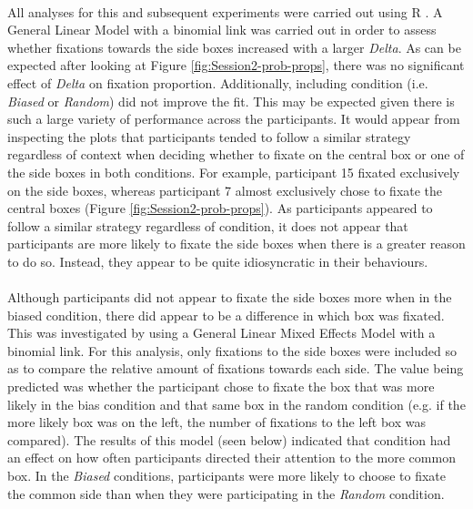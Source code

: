 \documentclass[12pt]{article}
\begin{document}
\paragraph{} All analyses for this and subsequent experiments were carried out using R \cite{R}. A General Linear Model with a binomial link was carried out in order to assess whether fixations towards the side boxes increased with a larger \textit{Delta}. As can be expected after looking at Figure \ref{fig:Session2-prob-props}, there was no significant effect of \textit{Delta} on fixation proportion. Additionally, including condition (i.e. \textit{Biased} or \textit{Random}) did not improve the fit. This may be expected given there is such a large variety of performance across the participants. It would appear from inspecting the plots that participants tended to follow a similar strategy regardless of context when deciding whether to fixate on the central box or one of the side boxes in both conditions. For example, participant 15  fixated exclusively on the side boxes, whereas participant 7 almost exclusively chose to fixate the central boxes (Figure \ref{fig:Session2-prob-props}). As participants appeared to follow a similar strategy regardless of condition, it does not appear that participants are more likely to fixate the side boxes when there is a greater reason to do so. Instead, they appear to be quite idiosyncratic in their behaviours. 

\paragraph{} Although participants did not appear to fixate the side boxes more when in the biased condition, there did appear to be a difference in which box was fixated. This was investigated by using a General Linear Mixed Effects Model with a binomial link. For this analysis, only fixations to the side boxes were included so as to compare the relative amount of fixations towards each side. The value being predicted was whether the participant chose to fixate the box that was more likely in the bias condition and that same box in the random condition (e.g. if the more likely box was on the left, the number of fixations to the left box was compared). The results of this model (seen below) indicated that condition had an effect on how often participants directed their attention to the more common box. In the \textit{Biased} conditions, participants were more likely to choose to fixate the common side than when they were participating in the \textit{Random} condition.
\end{document}
